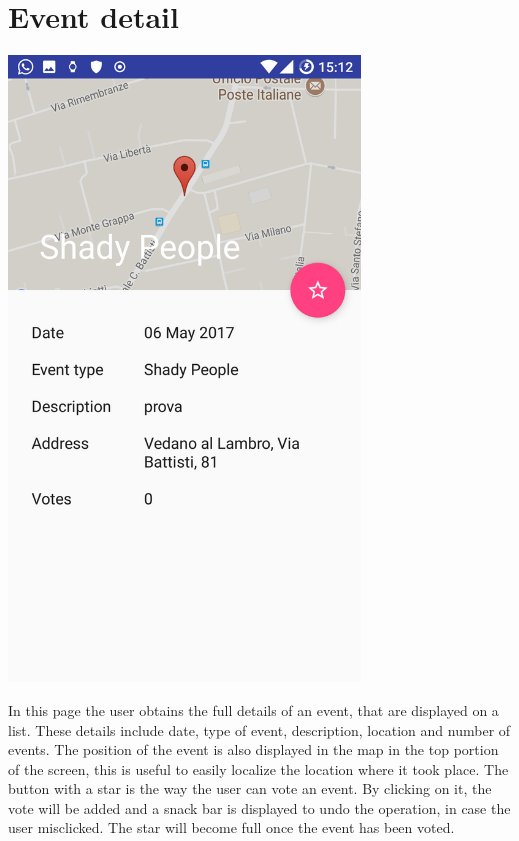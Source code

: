 \documentclass[a4paper]{scrreprt}
\begin{document}
\section{Event detail}
\begin{minipage}{0.5\textwidth}
	\centering
	\includegraphics[width=0.7\textwidth]{imgs/event_detail}
\end{minipage}
\begin{minipage}{0.5\textwidth}
	In this page the user obtains the full details of an event, that are displayed on a list. These details include date, type of event, description, location and number of events. The position of the event is also displayed in the map in the top portion of the screen, this is useful to easily localize the location where it took place. The button with a star is the way the user can vote an event. By clicking on it, the vote will be added and a snack bar is displayed to undo the operation, in case the user misclicked. The star will become full once the event has been voted.
\end{minipage}
\end{document}
